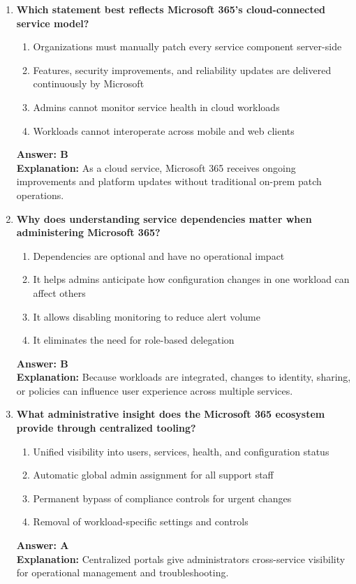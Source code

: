 \documentclass[10pt]{article}
\begin{document}
\begin{enumerate}[leftmargin=*]
\item \textbf{Which statement best reflects Microsoft 365's cloud-connected service model?}
\begin{enumerate}[label=\Alph*.]
  \item Organizations must manually patch every service component server-side
  \item Features, security improvements, and reliability updates are delivered continuously by Microsoft
  \item Admins cannot monitor service health in cloud workloads
  \item Workloads cannot interoperate across mobile and web clients
\end{enumerate}
\textbf{Answer: B}\\
\textbf{Explanation:} As a cloud service, Microsoft 365 receives ongoing improvements and platform updates without traditional on-prem patch operations.

\item \textbf{Why does understanding service dependencies matter when administering Microsoft 365?}
\begin{enumerate}[label=\Alph*.]
  \item Dependencies are optional and have no operational impact
  \item It helps admins anticipate how configuration changes in one workload can affect others
  \item It allows disabling monitoring to reduce alert volume
  \item It eliminates the need for role-based delegation
\end{enumerate}
\textbf{Answer: B}\\
\textbf{Explanation:} Because workloads are integrated, changes to identity, sharing, or policies can influence user experience across multiple services.

\item \textbf{What administrative insight does the Microsoft 365 ecosystem provide through centralized tooling?}
\begin{enumerate}[label=\Alph*.]
  \item Unified visibility into users, services, health, and configuration status
  \item Automatic global admin assignment for all support staff
  \item Permanent bypass of compliance controls for urgent changes
  \item Removal of workload-specific settings and controls
\end{enumerate}
\textbf{Answer: A}\\
\textbf{Explanation:} Centralized portals give administrators cross-service visibility for operational management and troubleshooting.


\end{enumerate}
\end{document}
